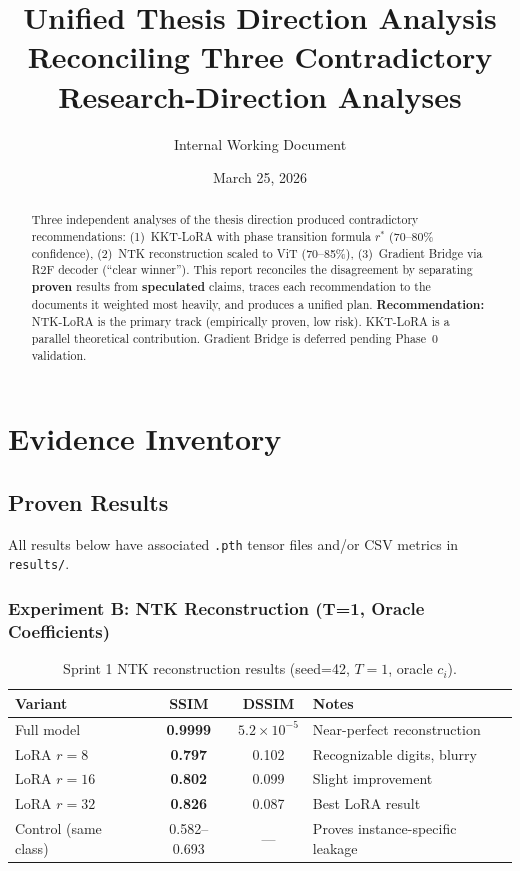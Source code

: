 \documentclass[11pt,a4paper]{article}
\title{\textbf{Unified Thesis Direction Analysis}\\[6pt]
\large Reconciling Three Contradictory Research-Direction Analyses}
\author{Internal Working Document}
\date{March 25, 2026}
\newcommand{\proven}[1]{\textcolor{proven}{\textbf{#1}}}
\newcommand{\speculated}[1]{\textcolor{speculated}{\textbf{#1}}}
\begin{document}
\maketitle

\begin{abstract}
Three independent analyses of the thesis direction produced contradictory recommendations:
(1)~KKT-LoRA with phase transition formula $r^*$ (70--80\% confidence),
(2)~NTK reconstruction scaled to ViT (70--85\%),
(3)~Gradient Bridge via R2F decoder (``clear winner'').
This report reconciles the disagreement by separating \proven{proven} results from \speculated{speculated} claims, traces each recommendation to the documents it weighted most heavily, and produces a unified plan.
\textbf{Recommendation:} NTK-LoRA is the primary track (empirically proven, low risk).
KKT-LoRA is a parallel theoretical contribution.
Gradient Bridge is deferred pending Phase~0 validation.
\end{abstract}

\tableofcontents
\newpage

\section{Evidence Inventory}

\subsection{Proven Results}

All results below have associated \texttt{.pth} tensor files and/or CSV metrics in \texttt{results/}.

\subsubsection{Experiment B: NTK Reconstruction (T=1, Oracle Coefficients)}

\begin{table}[H]
\centering
\caption{Sprint 1 NTK reconstruction results (seed=42, $T=1$, oracle $c_i$).}
\label{tab:ntk-oracle}
\begin{tabular}{lccl}
\toprule
\textbf{Variant} & \textbf{SSIM} & \textbf{DSSIM} & \textbf{Notes} \\
\midrule
Full model         & \proven{0.9999} & $5.2\times10^{-5}$ & Near-perfect reconstruction \\
LoRA $r\!=\!8$     & \proven{0.797}  & 0.102              & Recognizable digits, blurry \\
LoRA $r\!=\!16$    & \proven{0.802}  & 0.099              & Slight improvement \\
LoRA $r\!=\!32$    & \proven{0.826}  & 0.087              & Best LoRA result \\
Control (same class) & 0.582--0.693  & ---                & Proves instance-specific leakage \\
\bottomrule
\end{tabular}
\end{table}
\end{document}
